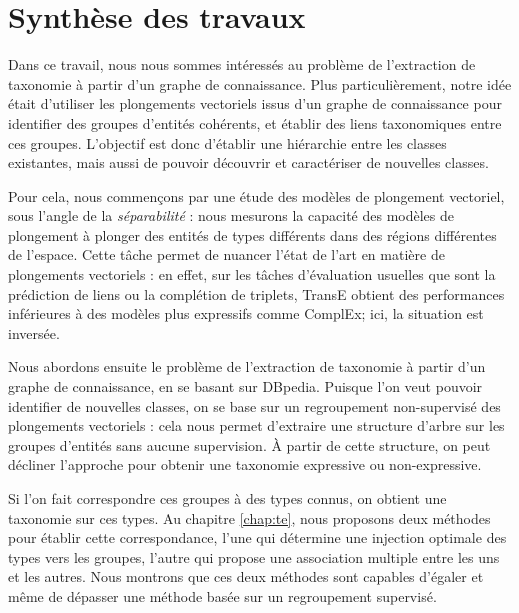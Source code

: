 \label{sec:Conclusion}




\section{Synthèse des travaux}


Dans ce travail, nous nous sommes intéressés au %
problème de l'extraction de taxonomie à partir d'un graphe de connaissance. Plus particulièrement, notre idée était d'utiliser les plongements vectoriels issus d'un graphe de connaissance pour identifier des groupes d'entités cohérents, et établir des liens taxonomiques entre ces groupes. L'objectif est donc d'établir une hiérarchie entre les classes existantes, mais aussi de pouvoir découvrir et caractériser de nouvelles classes. 

Pour cela, nous commençons par une étude des modèles de plongement vectoriel, sous l'angle de la \textit{séparabilité} : nous mesurons la capacité des modèles de plongement à plonger des entités de types différents dans des régions différentes de l'espace. %
%
Cette tâche permet de nuancer l'état de l'art en matière de plongements vectoriels : en effet, sur les tâches d'évaluation usuelles que sont la prédiction de liens ou la complétion de triplets, TransE obtient des performances inférieures à des modèles plus expressifs comme ComplEx; ici, la situation est inversée.


Nous abordons ensuite le problème de l'extraction de taxonomie à partir d'un graphe de connaissance, en se basant sur DBpedia. Puisque l'on veut pouvoir identifier de nouvelles classes, on se base sur un regroupement non-supervisé des plongements vectoriels : cela nous permet d'extraire une structure d'arbre sur les groupes d'entités sans aucune supervision. À partir de cette structure, on peut décliner l'approche pour obtenir une taxonomie expressive ou non-expressive.

Si l'on fait correspondre ces groupes à des types connus, on obtient une taxonomie sur ces types. Au chapitre \ref{chap:te}, nous proposons deux méthodes pour établir cette correspondance, l'une qui détermine une injection optimale des types vers les groupes, l'autre qui propose une association multiple entre les uns et les autres. Nous montrons que ces deux méthodes sont capables d'égaler et même de dépasser une méthode basée sur un regroupement supervisé.

